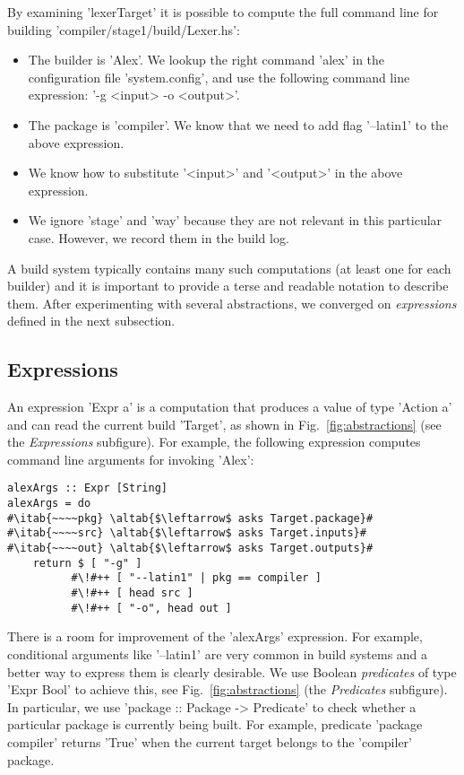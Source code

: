 \noindent By examining \lst'lexerTarget' it is possible to compute the full
command line for building \lst'compiler/stage1/build/Lexer.hs':
\begin{itemize}
  \item The builder is \lst'Alex'. We lookup the right command
  \lst'alex' in the configuration file \lst'system.config', and use the
  following command line expression: \lst'-g <input> -o <output>'.
  \item The package is \lst'compiler'. We know that we need to add
  flag \lst'--latin1' to the above expression.
  \item We know how to substitute \lst'<input>' and \lst'<output>' in the
  above expression.
  \item We ignore \lst'stage' and \lst'way' because they are not relevant
  in this particular case. However, we record them in the build log.
\end{itemize}

\noindent A build system typically contains many such computations (at least one
for each builder) and it is important to provide a terse and readable notation to
describe them. After experimenting with several abstractions, we converged on
\emph{expressions} defined in the next subsection.

\subsection{Expressions}

An expression \lst'Expr a' is a computation that produces a value of type
\lst'Action a' and can read the current build \lst'Target', as shown in
Fig.~\ref{fig:abstractions} (see the \emph{Expressions} subfigure). For example,
the following expression computes command line arguments for invoking \lst'Alex':

\newcommand{\altab}[1]{\hspace{.05\textwidth}\rlap{#1}}

\begin{lstlisting}
alexArgs :: Expr [String]
alexArgs = do
#\itab{~~~~pkg} \altab{$\leftarrow$ asks Target.package}#
#\itab{~~~~src} \altab{$\leftarrow$ asks Target.inputs}#
#\itab{~~~~out} \altab{$\leftarrow$ asks Target.outputs}#
    return $ [ "-g" ]
          #\!#++ [ "--latin1" | pkg == compiler ]
          #\!#++ [ head src ]
          #\!#++ [ "-o", head out ]
\end{lstlisting}

There is a room for improvement of the \lst'alexArgs' expression. For
example, conditional arguments like \lst'--latin1' are very common in build
systems and a better way to express them is clearly desirable. We use Boolean
\emph{predicates} of type \lst'Expr Bool' to achieve this, see
Fig.~\ref{fig:abstractions} (the \emph{Predicates} subfigure). In particular, we
use \lst'package :: Package -> Predicate' to check whether a particular package
is currently being built. For example, predicate \lst'package compiler'
returns \lst'True' when the current target belongs to the \lst'compiler'
package.


